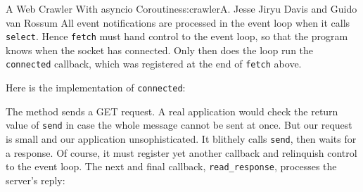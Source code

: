 \begin{aosachapter}{A Web Crawler With asyncio Coroutines}{s:crawler}{A. Jesse Jiryu Davis and Guido van Rossum}
All event notifications are processed in the event loop when it calls
\texttt{select}. Hence \texttt{fetch} must hand control to the event
loop, so that the program knows when the socket has connected. Only then
does the loop run the \texttt{connected} callback, which was registered
at the end of \texttt{fetch} above.

Here is the implementation of \texttt{connected}:

\begin{Shaded}
\begin{Highlighting}[]
     
        \NormalTok{(}\NormalTok{)}
        \NormalTok{(}
        \NormalTok{))}
        
\end{Highlighting}
\end{Shaded}

The method sends a GET request. A real application would check the
return value of \texttt{send} in case the whole message cannot be sent
at once. But our request is small and our application unsophisticated.
It blithely calls \texttt{send}, then waits for a response. Of course,
it must register yet another callback and relinquish control to the
event loop. The next and final callback, \texttt{read\_response},
processes the server's reply:

\begin{Shaded}
\begin{Highlighting}[]
     
         

        \NormalTok{)  }
         
        \NormalTok{:}
            

\end{Highlighting}
\end{Shaded}
\end{aosachapter}

